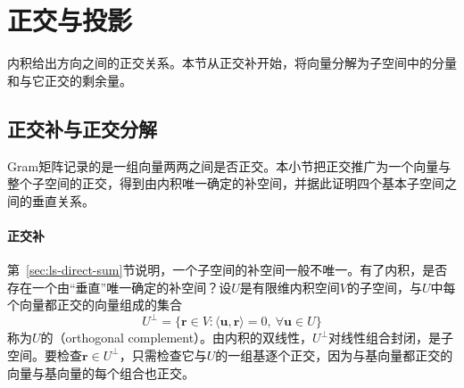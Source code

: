 \section{正交与投影}

内积给出方向之间的正交关系。本节从正交补开始，将向量分解为子空间中的分量和与它正交的剩余量。

\subsection{正交补与正交分解}
\label{sec:ls-orthogonality}

Gram矩阵记录的是一组向量两两之间是否正交。本小节把正交推广为一个向量与整个子空间的正交，得到由内积唯一确定的补空间，并据此证明四个基本子空间之间的垂直关系。

\paragraph{正交补}
第~\ref{sec:ls-direct-sum}节说明，一个子空间的补空间一般不唯一。有了内积，是否存在一个由“垂直”唯一确定的补空间？设$U$是有限维内积空间$V$的子空间，与$U$中每个向量都正交的向量组成的集合
\[
 U^\perp=\{\bm r\in V:\langle\bm u,\bm r\rangle=0,\ \forall\bm u\in U\}
\]
称为$U$的（orthogonal complement）。由内积的双线性，$U^\perp$对线性组合封闭，是子空间。要检查$\bm r\in U^\perp$，只需检查它与$U$的一组基逐个正交，因为与基向量都正交的向量与基向量的每个组合也正交。

